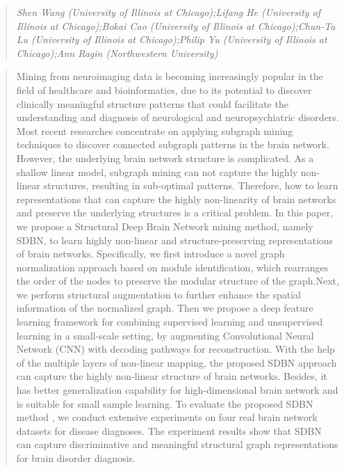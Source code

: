 \documentclass{article}
\begin{document}
\begin{quote}
\footnotesize{\textit{Shen Wang (University of Illinois at Chicago);Lifang He (University of Illinois at Chicago);Bokai Cao (University of Illinois at Chicago);Chun-Ta Lu (University of Illinois at Chicago);Philip Yu (University of Illinois at Chicago);Ann Ragin (Northwestern University)}}

\end{quote}

\begin{quote}
Mining from neuroimaging data is becoming increasingly popular in the field of healthcare and bioinformatics, due to its potential to discover clinically meaningful structure patterns that could facilitate the understanding and diagnosis of neurological and neuropsychiatric disorders. Most recent researches concentrate on applying subgraph mining techniques to discover connected subgraph patterns in the brain network. However, the underlying brain network structure is complicated. As a shallow linear model, subgraph mining can not capture the highly non-linear structures, resulting in sub-optimal patterns. Therefore, how to learn representations that can capture the highly non-linearity of brain networks and preserve the underlying structures is a critical problem. In this paper, we propose a Structural Deep Brain Network mining method, namely SDBN, to learn highly non-linear and structure-preserving representations of brain networks. Specifically, we first introduce a novel graph normalization approach based on module identification, which rearranges the order of the nodes to preserve the modular structure of the graph.Next, we perform structural augmentation to further enhance the spatial information of the normalized graph. Then we propose a deep feature learning framework for combining supervised learning and unsupervised learning in a small-scale setting, by augmenting Convolutional Neural Network (CNN) with decoding pathways for reconstruction. With the help of the multiple layers of non-linear mapping, the proposed SDBN approach can capture the highly non-linear structure of brain networks. Besides, it has better generalization capability for high-dimensional brain network and is suitable for small sample learning. To evaluate the proposed SDBN method , we conduct extensive experiments on four real brain network datasets for disease diagnoses. The experiment results show that SDBN can capture discriminative and meaningful structural graph representations for brain disorder diagnosis.
\end{quote}
\end{document}

